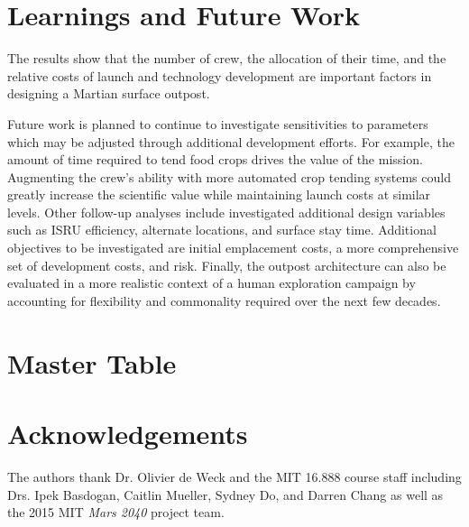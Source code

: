 \documentclass[]{aiaa-pretty}
\begin{document}
\section{Learnings and Future Work} 
The results show that the number of crew, the allocation of their time, and the relative costs of launch and technology development are important factors in designing a Martian surface outpost. 

Future work is planned to continue to investigate sensitivities to parameters which may be adjusted through additional development efforts. For example, the amount of time required to tend food crops drives the value of the mission. Augmenting the crew's ability with more automated crop tending systems could greatly increase the scientific value while maintaining launch costs at similar levels. Other follow-up analyses include investigated additional design variables such as ISRU efficiency, alternate locations, and surface stay time. Additional objectives to be investigated are initial emplacement costs, a more comprehensive set of development costs, and risk. Finally, the outpost architecture can also be evaluated in a more realistic context of a human exploration campaign by accounting for flexibility and commonality required over the next few decades.



\appendix
\section{Master Table}
\label{app:mastertab}


\section*{Acknowledgements}
The authors thank Dr. Olivier de Weck and the MIT 16.888 course staff including Drs. Ipek Basdogan, Caitlin Mueller, Sydney Do, and Darren Chang as well as the 2015 MIT \textit{Mars 2040} project team.

%
%
\end{document}
